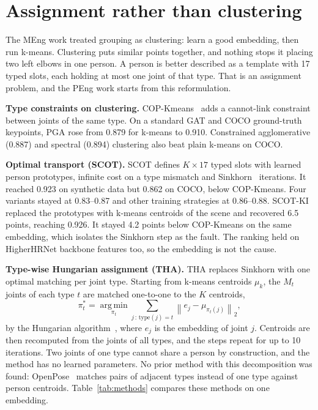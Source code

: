 \documentclass[11pt,a4paper]{article}
\begin{document}
\section{Assignment rather than clustering}
\label{sec_assignment}

The MEng work treated grouping as clustering: learn a good embedding, then run k-means.
Clustering puts similar points together, and nothing stops it placing two left elbows in one person.
A person is better described as a template with 17 typed slots, each holding at most one joint of that type.
That is an assignment problem, and the PEng work starts from this reformulation.

\textbf{Type constraints on clustering.}
COP-Kmeans~\citep{wagstaff2001copkmeans} adds a cannot-link constraint between joints of the same type.
On a standard GAT and COCO ground-truth keypoints, PGA rose from 0.879 for k-means to 0.910.
Constrained agglomerative (0.887) and spectral (0.894) clustering also beat plain k-means on COCO.

\textbf{Optimal transport (SCOT).}
SCOT defines $K \times 17$ typed slots with learned person prototypes, infinite cost on a type mismatch and
Sinkhorn~\citep{cuturi2013sinkhorn} iterations.
It reached 0.923 on synthetic data but 0.862 on COCO, below COP-Kmeans.
Four variants stayed at 0.83--0.87 and other training strategies at 0.86--0.88.
SCOT-KI replaced the prototypes with k-means centroids of the scene and recovered 6.5 points, reaching 0.926.
It stayed 4.2 points below COP-Kmeans on the same embedding, which isolates the Sinkhorn step as the fault.
The ranking held on HigherHRNet backbone features too, so the embedding is not the cause.

\textbf{Type-wise Hungarian assignment (THA).}
THA replaces Sinkhorn with one optimal matching per joint type.
Starting from k-means centroids $\mu_k$, the $M_t$ joints of each type $t$ are matched one-to-one to the $K$ centroids,
\begin{equation}
    \pi_t^\ast = \operatorname*{arg\,min}_{\pi_t} \sum_{j\,:\,\mathrm{type}(j)=t} \left\| e_j - \mu_{\pi_t(j)} \right\|_2 ,
    \label{eq:tha}
\end{equation}
by the Hungarian algorithm~\citep{kuhn1955hungarian}, where $e_j$ is the embedding of joint $j$.
Centroids are then recomputed from the joints of all types, and the steps repeat for up to 10 iterations.
Two joints of one type cannot share a person by construction, and the method has no learned parameters.
No prior method with this decomposition was found:
OpenPose~\citep{cao2017openpose} matches pairs of adjacent types instead of one type against person centroids.
Table~\ref{tab:methods} compares these methods on one embedding.
\end{document}
